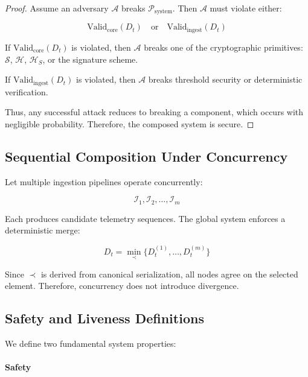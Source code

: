 \begin{proof}
Assume an adversary $\mathcal{A}$ breaks $\mathcal{P}_{\text{system}}$. Then $\mathcal{A}$ must violate either:

\begin{equation}
\text{Valid}_{\text{core}}(D_t) \quad \text{or} \quad \text{Valid}_{\text{ingest}}(D_t)
\end{equation}

If $\text{Valid}_{\text{core}}(D_t)$ is violated, then $\mathcal{A}$ breaks one of the cryptographic primitives: $\mathcal{S}$, $\mathcal{H}$, $\mathcal{H}_S$, or the signature scheme.

If $\text{Valid}_{\text{ingest}}(D_t)$ is violated, then $\mathcal{A}$ breaks threshold security or deterministic verification.

Thus, any successful attack reduces to breaking a component, which occurs with negligible probability. Therefore, the composed system is secure.
\end{proof}

\subsection{Sequential Composition Under Concurrency}

Let multiple ingestion pipelines operate concurrently:

\begin{equation}
\mathcal{I}_1, \mathcal{I}_2, \dots, \mathcal{I}_m
\end{equation}

Each produces candidate telemetry sequences. The global system enforces a deterministic merge:

\begin{equation}
D_t = \min_{\prec} \{D_t^{(1)}, \dots, D_t^{(m)}\}
\end{equation}

Since $\prec$ is derived from canonical serialization, all nodes agree on the selected element. Therefore, concurrency does not introduce divergence.

\subsection{Safety and Liveness Definitions}

We define two fundamental system properties:

\paragraph{Safety}

